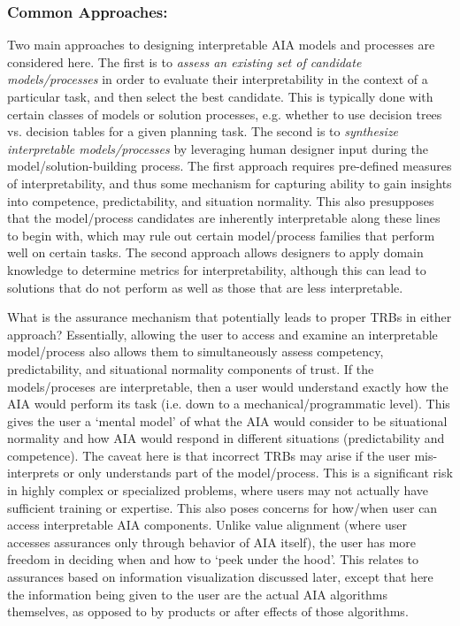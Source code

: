 \subsubsection{Common Approaches:}
Two main approaches to designing interpretable AIA models and processes are considered here. 
The first is to \emph{assess an existing set of candidate models/processes} in order to evaluate their interpretability in the context of a particular task, and then select the best candidate. 
This is typically done with certain classes of models or solution processes, e.g. whether to use decision trees vs. decision tables for a given planning task. 
The second is to \emph{synthesize interpretable models/processes} by leveraging human designer input during the model/solution-building process. 
The first approach requires pre-defined measures of interpretability, and thus some mechanism for capturing ability to gain insights into competence, predictability, and situation normality. This also presupposes that the model/process candidates are inherently interpretable along these lines to begin with, which may rule out certain model/process families that perform well on certain tasks. 
The second approach allows designers to apply domain knowledge to determine metrics for interpretability, although this can lead to solutions that do not perform as well as those that are less interpretable. 

What is the assurance mechanism that potentially leads to proper TRBs in either approach? 
Essentially, allowing the user to access and examine an interpretable model/process also allows them to simultaneously assess competency, predictability, and situational normality components of trust. If the models/proceses are interpretable, then a user would understand exactly how the AIA would perform its task (i.e. down to a mechanical/programmatic level). 
This gives the user a `mental model' of what the AIA would consider to be situational normality and how AIA would respond in different situations (predictability and competence). 
The caveat here is that incorrect TRBs may arise if the user mis-interprets or only understands part of the model/process. 
This is a significant risk in highly complex or specialized problems, where users may not actually have sufficient training or expertise. This also poses concerns for how/when user can access interpretable AIA components. 
Unlike value alignment (where user accesses assurances only through behavior of AIA itself), the user has more freedom in deciding when and how to `peek under the hood'. This relates to assurances based on information visualization discussed later, except that here the information being given to the user are the actual AIA algorithms themselves, as opposed to by products or after effects of those algorithms. %

